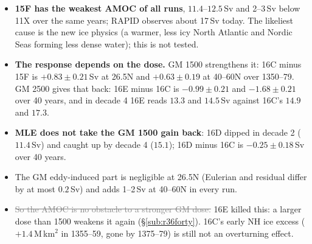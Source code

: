 \documentclass[10pt]{article}
\newcommand{\dead}[1]{\textcolor{gray}{\sout{#1}}}
\begin{document}
\begin{itemize}\itemsep2pt
\item \textbf{15F has the weakest AMOC of all runs}, $11.4$--$12.5$\,Sv and 2--3\,Sv below 11X
over the same years; RAPID observes about 17\,Sv today. The likeliest cause is the new ice
physics (a warmer, less icy North Atlantic and Nordic Seas forming less dense water); this is
not tested.
\item \textbf{The response depends on the dose.} GM 1500 strengthens it: 16C minus 15F is
$+0.83\pm0.21$\,Sv at 26.5N and $+0.63\pm0.19$ at 40--60N over 1350--79. GM 2500 gives that back:
16E minus 16C is $-0.99\pm0.21$ and $-1.68\pm0.21$ over 40 years, and in decade 4 16E reads
$13.3$ and $14.5$\,Sv against 16C's $14.9$ and $17.3$.
\item \textbf{MLE does not take the GM 1500 gain back}: 16D dipped in decade 2 ($11.4$\,Sv) and
caught up by decade 4 ($15.1$); 16D minus 16C is $-0.25\pm0.18$\,Sv over 40 years.
\item The GM eddy-induced part is negligible at 26.5N (Eulerian and residual differ by at most
$0.2$\,Sv) and adds 1--2\,Sv at 40--60N in every run.
\item \dead{So the AMOC is no obstacle to a stronger GM dose.} 16E killed this: a larger
dose than 1500 weakens it again (\S\ref{sub:r36forty}). 16C's early NH ice excess
($+1.4$\,M\,km$^2$ in 1355--59, gone by 1375--79) is still not an overturning effect.
\end{itemize}
\end{document}
